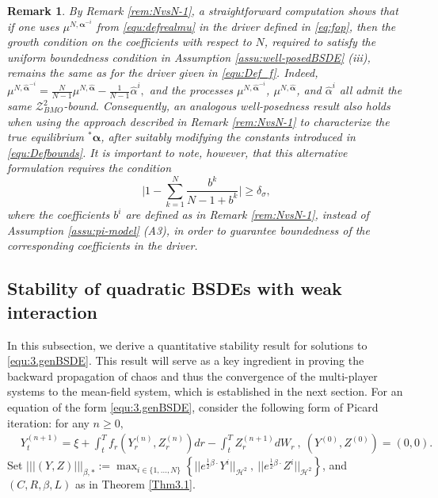 \documentclass[10pt,a4paper]{article}
\newcommand{\Balpha}{\boldsymbol{\alpha}}
\newcommand{\hBalpha}{\hat{\Balpha}}
\theoremstyle{plain}
\newtheorem{Remark}[Theorem]{Remark}
\theoremstyle{definition}
\numberwithin{equation}{section}
\newcommand{\lps}[2]{{}^{#1}\!#2}
\newcommand{\trinm}[1]{\vert\!\vert\!\vert #1 \vert\!\vert\!\vert}
\begin{document}

\begin{Remark}
\label{Rem:trueeq-wellposed}
By Remark \ref{rem:NvsN-1}, a straightforward computation shows that if one uses $\mu^{N,\Balpha^{-i}}$ from \eqref{equ:defrealmu} in the driver defined in \eqref{eq:fop}, then the growth condition on the coefficients with respect to \(N\), required to satisfy the uniform boundedness condition in Assumption \ref{assu:well-posedBSDE} \textnormal{(iii)}, remains the same as for the driver given in \eqref{equ:Def_f}. Indeed,
$
\mu^{N,\hBalpha^{-i}}
=
\frac{N}{N-1}\mu^{N,\hBalpha}
-
\frac{1}{N-1}\hat{\alpha}^{i},
$
and the processes $\mu^{N,\hBalpha^{-i}}$, $\mu^{N,\hBalpha}$, and $\hat{\alpha}^{i}$ all admit the same $\mathcal{Z}_{BMO}^{2}$-bound.
Consequently, an analogous well-posedness result also holds when using the approach described in Remark \ref{rem:NvsN-1} to characterize the true equilibrium $\lps{*}\Balpha$, after suitably modifying the constants introduced in \eqref{equ:Defbounds}. It is important to note, however, that this alternative formulation requires the condition
\begin{equation}
\label{equ:a3'}
\bigg|
1-\sum_{k=1}^{N}\frac{b^{k}}{N-1+b^{k}}
\bigg|
\geq
\delta_{\sigma},
\end{equation}
where the coefficients \(b^i\) are defined as in Remark \ref{rem:NvsN-1}, instead of Assumption \ref{assu:pi-model} \textnormal{(A3)}, in order to guarantee boundedness of the corresponding coefficients in the driver.
\end{Remark}

\subsection{Stability of quadratic BSDEs with weak interaction}


In this subsection, we derive a quantitative stability result for solutions to \eqref{equ:3.genBSDE}. This result will serve as a key ingredient in proving the backward propagation of chaos and thus the convergence of the multi-player systems to the mean-field system, which is established in the next section. For an equation of the form \eqref{equ:3.genBSDE}, consider the following form of Picard iteration: for any $n\ge 0,$
\begin{align}
&Y_{t}^{(n+1)} = \xi + \int_{t}^{T}f_{r}(Y_{r}^{(n)},Z_{r}^{(n)})dr - \int_{t}^{T}Z_{r}^{(n+1)}dW_{r} \ , \ (Y^{(0)},Z^{(0)}) = (0,0). \label{equ:stab3}
\end{align}
Set $
\trinm{(Y,Z)}_{\beta,*} := \max_{i \in \{1,...,N\}} \left\{||e^{\tfrac{1}{2}\beta\cdot}Y^{i}||_{\mathcal{H}^{2}} \ , \ ||e^{\tfrac{1}{2}\beta\cdot}Z^{i}||_{\mathcal{H}^{2}} \right\}
$, and $(C, R, \beta, L)$ as in Theorem \ref{Thm3.1}.
\end{document}
